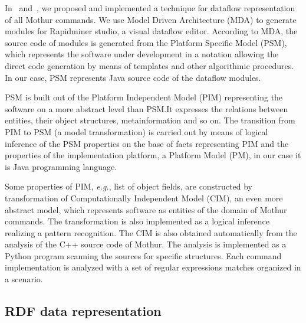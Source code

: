\documentclass[a4paper]{jpconf}
\begin{document}

In~\cite{cherk19} and~\cite{zont19}, we proposed and implemented a technique for dataflow representation of all Mothur commands.  We use Model Driven Architecture (MDA) to generate modules for Rapidminer studio, a visual dataflow editor.  According to MDA, the source code of modules is generated from the Platform Specific Model (PSM), which represents the software under development in a notation allowing the direct code generation by means of templates and other algorithmic procedures.  In our case, PSM represents Java source code of the dataflow modules.

PSM is built out of the Platform Independent Model (PIM) representing the software on a more abstract level than PSM.\@  It expresses the relations between entities, their object structures, metainformation and so on.  The transition from PIM to PSM (a model transformation) is carried out by means of logical inference of the PSM properties on the base of facts representing PIM and the properties of the implementation platform, a Platform Model (PM), in our case it is Java programming language.

Some properties of PIM, \emph{e.g.}, list of object fields, are constructed by transformation of Computationally Independent Model (CIM), an even more abstract model, which represents software as entities of the domain of Mothur commands.  The transformation is also implemented as a logical inference realizing a pattern recognition.  The CIM is also obtained automatically from the analysis of the C++ source code of Mothur.  The analysis is implemented as a Python program scanning the sources for specific structures.  Each command implementation is analyzed with a set of regular expressions matches organized in a scenario.

\subsection{RDF data representation}
\end{document}
